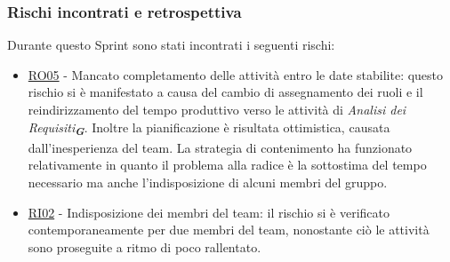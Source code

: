 \documentclass[a4paper,12pt]{article}
\newcommand{\glossario}[1]{\textit{#1}\textsubscript{\textbf{\textit{\textcolor{lightblack}{G}}}}}
\begin{document}
\subsubsection{Rischi incontrati e retrospettiva}
Durante questo Sprint sono stati incontrati i seguenti rischi:
\begin{itemize}
    \item \hyperref[RO05]{RO05} - Mancato completamento delle attività entro le date stabilite: questo rischio si è manifestato a causa del cambio di assegnamento dei ruoli e il reindirizzamento del tempo produttivo verso le attività di \glossario{Analisi dei Requisiti}. Inoltre la pianificazione è risultata ottimistica, causata dall'inesperienza del team. La strategia di contenimento ha funzionato relativamente in quanto il problema alla radice è la sottostima del tempo necessario ma anche l'indisposizione di alcuni membri del gruppo.
    \item \hyperref[RI02]{RI02} - Indisposizione dei membri del team: il rischio si è verificato contemporaneamente per due membri del team, nonostante ciò le attività sono proseguite a ritmo di poco rallentato.
\end{itemize}
\end{document}
